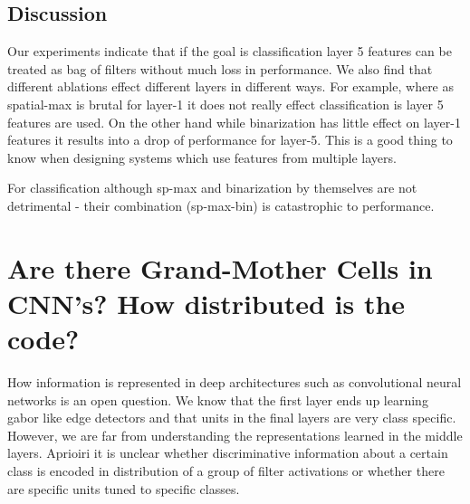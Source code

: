\documentclass[runningheads]{llncs}
\begin{document}
\setlength{\tabcolsep}{1pt}
\begin{table}[t!]
\begin{center}
\caption{Effect of various feature ablations on object detection using R-CNN\cite{Rcnn}.}
\label{table:det-ablation}
\end{center}
\end{table}
\setlength{\tabcolsep}{1.4pt}



\subsection{Discussion}
Our experiments indicate that if the goal is classification layer 5 features can be treated as bag of filters without much loss in performance. We also find that different ablations effect different layers in different ways. For example, where as spatial-max is brutal for layer-1 it does not really effect classification is layer 5 features are used. On the other hand while binarization has little effect on layer-1 features it results into a drop of performance for layer-5. This is a good thing to know when designing systems which use features from multiple layers.

For classification although sp-max and binarization by themselves are not detrimental - their combination (sp-max-bin) is catastrophic to performance.

\section{Are there Grand-Mother Cells in CNN's? How distributed is the code?}
\label{sec:grand-mother}
How information is represented in deep architectures such as convolutional neural networks is an open question. We know that the first layer ends up learning gabor like edge detectors and that units in the final layers are very class specific. However, we are far from understanding the representations learned in the middle layers. Aprioiri it is unclear whether discriminative information about a certain class is encoded in distribution of a group of filter activations or whether there are specific units tuned to specific classes.
\end{document}
